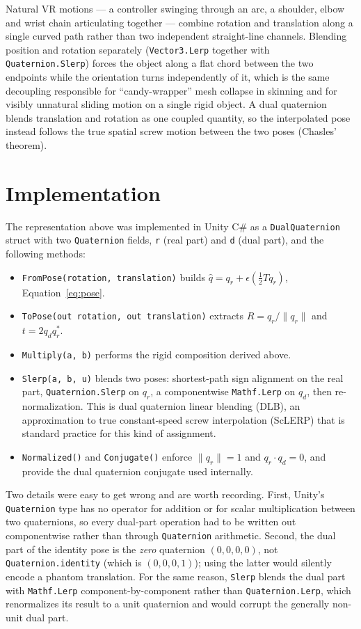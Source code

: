 \documentclass[11pt]{article}
\begin{document}
Natural VR motions --- a controller swinging through an arc, a shoulder,
elbow and wrist chain articulating together --- combine rotation and
translation along a single curved path rather than two independent
straight-line channels. Blending position and rotation separately
(\texttt{Vector3.Lerp} together with \texttt{Quaternion.Slerp}) forces the
object along a flat chord between the two endpoints while the orientation
turns independently of it, which is the same decoupling responsible for
``candy-wrapper'' mesh collapse in skinning and for visibly unnatural sliding
motion on a single rigid object. A dual quaternion blends translation and
rotation as one coupled quantity, so the interpolated pose instead follows
the true spatial screw motion between the two poses (Chasles' theorem).

\section{Implementation}
\label{sec:implementation}

The representation above was implemented in Unity C\# as a
\texttt{DualQuaternion} struct with two \texttt{Quaternion} fields, \texttt{r}
(real part) and \texttt{d} (dual part), and the following methods:

\begin{itemize}
\raggedright
  \item \texttt{FromPose(rotation, translation)} builds
    $\hat q = q_r + \epsilon(\tfrac12 T q_r)$, Equation~\eqref{eq:pose}.
  \item \texttt{ToPose(out rotation, out translation)} extracts
    $R = q_r/\lVert q_r\rVert$ and $t = 2 q_d q_r^{*}$.
  \item \texttt{Multiply(a, b)} performs the rigid composition derived above.
  \item \texttt{Slerp(a, b, u)} blends two poses: shortest-path sign
    alignment on the real part, \texttt{Quaternion.Slerp} on $q_r$, a
    componentwise \texttt{Mathf.Lerp} on $q_d$, then re-normalization. This is
    dual quaternion linear blending (DLB), an approximation to true
    constant-speed screw interpolation (ScLERP) that is standard practice for
    this kind of assignment.
  \item \texttt{Normalized()} and \texttt{Conjugate()} enforce
    $\lVert q_r\rVert = 1$ and $q_r \cdot q_d = 0$, and provide the dual
    quaternion conjugate used internally.
\end{itemize}

Two details were easy to get wrong and are worth recording. First, Unity's
\texttt{Quaternion} type has no operator for addition or for scalar
multiplication between two quaternions, so every dual-part operation had to
be written out componentwise rather than through \texttt{Quaternion}
arithmetic. Second, the dual part of the identity pose is the \emph{zero}
quaternion $(0,0,0,0)$, not \texttt{Quaternion.identity} (which is
$(0,0,0,1)$); using the latter would silently encode a phantom translation.
For the same reason, \texttt{Slerp} blends the dual part with
\texttt{Mathf.Lerp} component-by-component rather than
\texttt{Quaternion.Lerp}, which renormalizes its result to a unit quaternion
and would corrupt the generally non-unit dual part.
\end{document}

